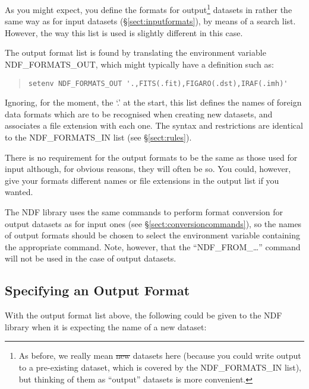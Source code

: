 As you might expect, you define the formats for output\footnote{As
before, we really mean \st{new} datasets here (because you could
write output to a pre-existing dataset, which is covered by the
NDF\_FORMATS\_IN list), but thinking of them as ``output'' datasets is
more convenient.} datasets in rather the same way as for input
datasets (\S\ref{sect:inputformats}), by means of a search
list. However, the way this list is used is slightly different in this
case.

The output format list is found by translating the environment
variable NDF\_FORMATS\_OUT, which might typically have a definition
such as:

\begin{quote}
\begin{small}
\begin{verbatim}
setenv NDF_FORMATS_OUT '.,FITS(.fit),FIGARO(.dst),IRAF(.imh)'
\end{verbatim}
\end{small}
\end{quote}

Ignoring, for the moment, the `.' at the start, this list defines the
names of foreign data formats which are to be recognised when creating
new datasets, and associates a file extension with each one. The
syntax and restrictions are identical to the NDF\_FORMATS\_IN list
(see \S\ref{sect:rules}).

There is no requirement for the output formats to be the same as those
used for input although, for obvious reasons, they will often be
so. You could, however, give your formats different names or file
extensions in the output list if you wanted.

The NDF library uses the same commands to perform format conversion
for output datasets as for input ones (see
\S\ref{sect:conversioncommands}), so the names of output formats
should be chosen to select the environment variable containing the
appropriate command. Note, however, that the ``NDF\_FROM\_\ldots''
command will not be used in the case of output datasets.

\subsection{Specifying an Output Format}

With the output format list above, the following could
be given to the NDF library when it is expecting the name of a new
dataset:

